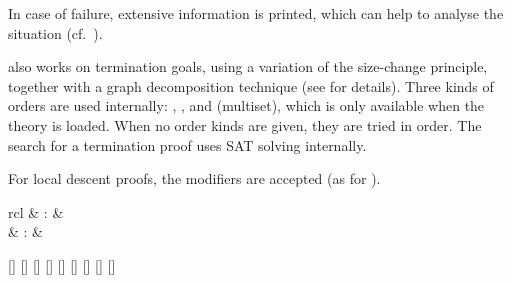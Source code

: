 \begin{isabellebody}
\begin{isamarkuptext}
\begin{description}
  In case of failure, extensive information is printed, which can help
  to analyse the situation (cf.\ \cite{isabelle-function}).

  \item \hyperlink{method.HOL.size-change}{\mbox{}} also works on termination goals,
  using a variation of the size-change principle, together with a
  graph decomposition technique (see \cite{krauss_phd} for details).
  Three kinds of orders are used internally: , ,
  and  (multiset), which is only available when the theory
   is loaded. When no order kinds are given, they are
  tried in order. The search for a termination proof uses SAT solving
  internally.

  For local descent proofs, the \hyperlink{syntax.clasimpmod}{\mbox{}} modifiers are
  accepted (as for \hyperlink{method.auto}{\mbox{}}).

  \end{description}%
\end{isamarkuptext}%
\isamarkuptrue%
%
\isamarkuptrue%
%
\begin{isamarkuptext}%
\begin{matharray}{rcl}
    \hypertarget{command.HOL.partial-function}{\hyperlink{command.HOL.partial-function}{\mbox{}}} & : &  \\
    \hypertarget{attribute.HOL.partial-function-mono}{\hyperlink{attribute.HOL.partial-function-mono}{\mbox{}}} & : &  \\
  \end{matharray}

  \begin{railoutput}
[]
\rail@bar
{}
[]
\rail@endbar
{}[]
[]
[]
[]
[]
\rail@bar
{}
[]
\rail@endbar
{}[]
\rail@end
\end{railoutput}



\end{isamarkuptext}
\end{isabellebody}
